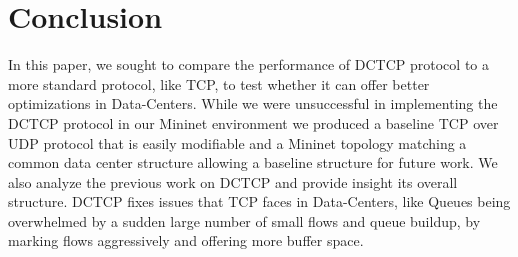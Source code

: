 \documentclass[%
 reprint,
amsmath,amssymb,
aps,
]{revtex4-2}
\begin{document}
\section{Conclusion}
In this paper, we sought to compare the performance of DCTCP protocol to a more standard protocol, like TCP, to test whether it can offer better optimizations in Data-Centers. While we were unsuccessful in implementing the DCTCP protocol in our Mininet environment we produced a baseline TCP over UDP protocol that is easily modifiable and a Mininet topology matching a common data center structure allowing a baseline structure for future work. We also analyze the previous work on DCTCP and provide insight its overall structure. DCTCP fixes issues that TCP faces in Data-Centers, like Queues being overwhelmed by a sudden large number of small flows and queue buildup, by marking flows aggressively and offering more buffer space. 
\end{document}
